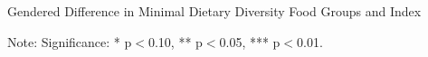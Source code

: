 \documentclass[11pt,harvard]{article}
\begin{document}
\begin{table}[htbp]
	\centering
	\begin{adjustbox}{max width=\textwidth}
		\begin{threeparttable}
			\caption{Gendered Difference in Minimal Dietary Diversity Food Groups and Index}
			\scriptsize
			 
			\label{tab:Myanmar_F2F_MDD_Gender}
			\begin{tablenotes}
				\item Note: Significance: * p$<$0.10, ** p$<$0.05, *** p$<$0.01. 
			\end{tablenotes}
		\end{threeparttable}
	\end{adjustbox}
\end{table}

\pagebreak
\end{document}
